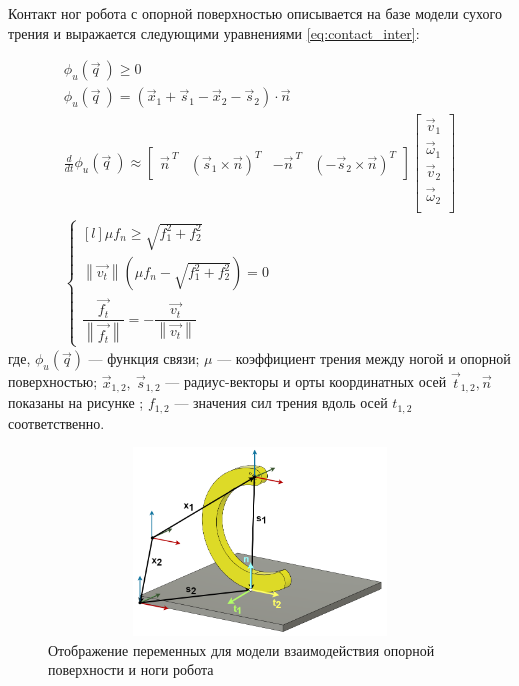 Контакт ног робота с опорной поверхностью  описывается на базе модели сухого трения и выражается следующими уравнениями \eqref{eq:contact_inter}:


\begin{align}
    \label{eq:contact_inter}
    \phi_u(\vec{q}\ ) \geqslant 0 \\ 
                        \phi_u(\vec{q}\ ) = (\vec{x}_1 + \vec{s}_1 - \vec{x}_2 - \vec{s}_2) \cdot \vec{n} \\
                        \frac{d }{d t}\phi_u(\vec{q}\ ) \approx \begin{bmatrix}
                            \vec{n}^{\ T} & (\vec{s}_1 \times \vec{n})^T & -\vec{n}^{\ T} & (-\vec{s}_2 \times \vec{n})^T
                        \end{bmatrix} \begin{bmatrix}
                            \vec{v}_1\\ 
                        \vec{\omega}_1\\ 
                        \vec{v}_2\\
                        \vec{\omega}_2\\
                        \end{bmatrix} \\
\left\{\begin{matrix*}[l]
\mu f_n \geqslant \sqrt{f_1^2 + f_2^2}\\ 
\left\lVert \vec{v_t}\right\rVert (\mu f_n - \sqrt{f_1^2 + f_2^2}) = 0\\
\dfrac{\vec{f_t}}{\left\lVert \vec{f_t}\right\rVert } = - \dfrac{\vec{v_t}}{\left\lVert \vec{v_t}\right\rVert }
\end{matrix*}\right.
\end{align}
где, $\phi_u(\vec{q})$ --- функция связи; $\mu $ --- коэффициент трения между ногой и опорной поверхностью; $\vec{x}_{1,2},\ \vec{s}_{1,2}$ --- радиус-векторы и орты координатных осей $\vec{t}_{1,2}, \vec{n}$ показаны на рисунке ; $ f_{1,2} $ --- значения сил трения вдоль осей $t_{1,2}$ соответственно.

\begin{figure}[H]
    \centering\includegraphics[height=5cm,width=1\textwidth,keepaspectratio]{images/contact_interaction.png}
    \caption{Отображение переменных для модели взаимодействия опорной поверхности и ноги робота}
    \label{fig:contact_interaction.png}
\end{figure}



